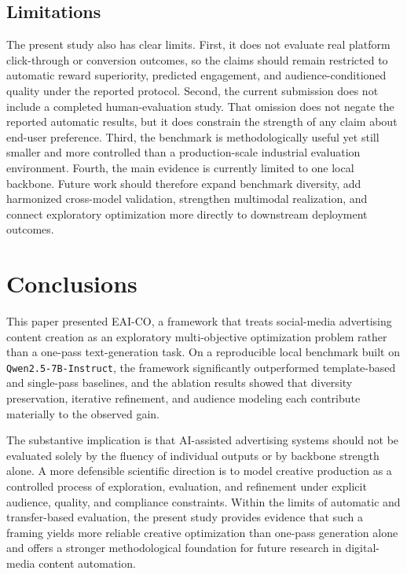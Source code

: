 \documentclass[applsci,article,submit,pdftex,moreauthors]{Definitions/mdpi}
\begin{document}
\subsection{Limitations}

The present study also has clear limits. First, it does not evaluate real platform click-through or conversion outcomes, so the claims should remain restricted to automatic reward superiority, predicted engagement, and audience-conditioned quality under the reported protocol. Second, the current submission does not include a completed human-evaluation study. That omission does not negate the reported automatic results, but it does constrain the strength of any claim about end-user preference. Third, the benchmark is methodologically useful yet still smaller and more controlled than a production-scale industrial evaluation environment. Fourth, the main evidence is currently limited to one local backbone. Future work should therefore expand benchmark diversity, add harmonized cross-model validation, strengthen multimodal realization, and connect exploratory optimization more directly to downstream deployment outcomes.

\section{Conclusions}

This paper presented EAI-CO, a framework that treats social-media advertising content creation as an exploratory multi-objective optimization problem rather than a one-pass text-generation task. On a reproducible local benchmark built on \texttt{Qwen2.5-7B-Instruct}, the framework significantly outperformed template-based and single-pass baselines, and the ablation results showed that diversity preservation, iterative refinement, and audience modeling each contribute materially to the observed gain.

The substantive implication is that AI-assisted advertising systems should not be evaluated solely by the fluency of individual outputs or by backbone strength alone. A more defensible scientific direction is to model creative production as a controlled process of exploration, evaluation, and refinement under explicit audience, quality, and compliance constraints. Within the limits of automatic and transfer-based evaluation, the present study provides evidence that such a framing yields more reliable creative optimization than one-pass generation alone and offers a stronger methodological foundation for future research in digital-media content automation.
\end{document}
